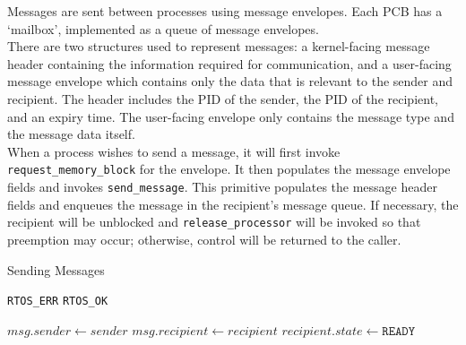 \documentclass[12pt]{report}
\begin{document}
Messages are sent between processes using message envelopes. Each PCB has a `mailbox', implemented as a queue of message envelopes.\\

There are two structures used to represent messages: a kernel-facing message header containing the information required for communication, and a user-facing message envelope which contains only the data that is relevant to the sender and recipient. The header includes the PID of the sender, the PID of the recipient, and an expiry time. The user-facing envelope only contains the message type and the message data itself.\\

When a process wishes to send a message, it will first invoke \texttt{request_memory_block} for the envelope. It then populates the message envelope fields and invokes \texttt{send_message}. This primitive populates the message header fields and enqueues the message in the recipient's message queue. If necessary, the recipient will be unblocked and \texttt{release_processor} will be invoked so that preemption may occur; otherwise, control will be returned to the caller.\\

\begin{algorithm}
\caption{Sending Messages}
\begin{algorithmic}[1]
        \State \Return \texttt{RTOS_ERR}
    \EndIf
            \State \Return {}
        \EndIf
    \EndIf
    \State \Return \texttt{RTOS_OK}
\EndProcedure

\Statex

    \State $msg.sender \leftarrow sender$
    \State $msg.recipient \leftarrow recipient$
    \State {}
        \State {}
        \State $recipient.state \leftarrow \texttt{READY}$
        \State {}
        \State {} 
    \Else
        \State {}
    \EndIf
\EndProcedure
\end{algorithmic}
\end{algorithm}
\end{document}
